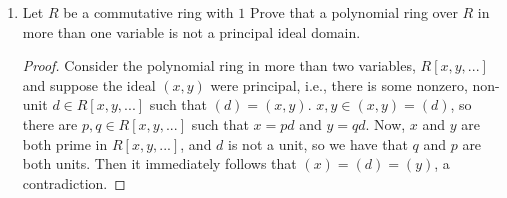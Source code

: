 \documentclass{report}
\begin{document}
\begin{enumerate}
	\item Let $R$ be a commutative ring with $1$ Prove that a polynomial ring over $R$ in more than one variable is not a principal ideal domain.
	\begin{proof}
		Consider the polynomial ring in more than two variables, $R[x,y,...]$ and suppose the ideal $(x,y)$ were principal, 
		i.e., there is some nonzero, non-unit $d \in R[x,y,...]$ such that $(d)=(x,y)$.
		$x,y\in(x,y)=(d)$, so there are $p,q\in R[x,y,...]$ such that $x=pd$ and $y=qd$.
		Now, $x$ and $y$ are both prime in $R[x,y,...]$, and $d$ is not a unit, so we have that $q$ and $p$ are both units.
		Then it immediately follows that $(x)=(d)=(y)$, a contradiction.
	\end{proof}
	
\end{enumerate}
\end{document}
